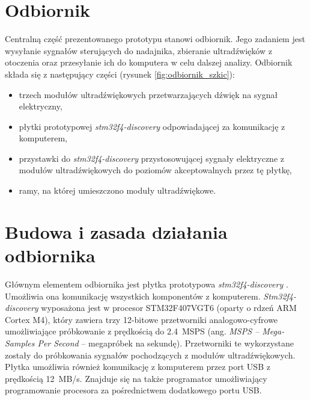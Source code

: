 \section{Odbiornik}

Centralną część prezentowanego prototypu stanowi odbiornik.
Jego zadaniem jest wysyłanie sygnałów sterujących do nadajnika, zbieranie ultradźwięków z otoczenia oraz przesyłanie 
ich do komputera w celu dalszej analizy.
Odbiornik składa się z następujący części (rysunek \ref{fig:odbiornik_szkic}):

\begin{itemize}
 \item trzech modułów ultradźwiękowych przetwarzających dźwięk na sygnał elektryczny,
 \item płytki prototypowej \textit{stm32f4-discovery} \cite{bib:stm32f4Discovery} odpowiadającej za komunikację z komputerem,
 \item przystawki do \textit{stm32f4-discovery} przystosowującej sygnały elektryczne z modułów ultradźwiękowych
  do poziomów akceptowalnych przez tę płytkę,
 \item ramy, na której umieszczono moduły ultradźwiękowe.
\end{itemize}




\section{Budowa i zasada działania odbiornika}

Głównym elementem odbiornika jest płytka prototypowa \textit{stm32f4-discovery} \cite{bib:stm32f4Discovery}.
 Umożliwia ona komunikację wszystkich komponentów z komputerem.
\textit{Stm32f4-discovery} wyposażona jest w procesor STM32F407VGT6 \cite{bib:stm32f407} (oparty o rdzeń ARM Cortex M4), 
który zawiera trzy 12-bitowe przetworniki
analogowo-cyfrowe umożliwiające próbkowanie z prędkością do \SI{2,4}{MSPS} 
(ang. \textit{MSPS -- Mega-Samples Per Second} -- megapróbek na sekundę). Przetworniki te wykorzystane zostały do próbkowania
sygnałów pochodzących z modułów ultradźwiękowych. Płytka umożliwia również komunikację z komputerem przez 
port USB z prędkością \SI{12}{MB/s}. Znajduje się na także programator
umożliwiający programowanie procesora za pośrednictwem dodatkowego portu USB.

